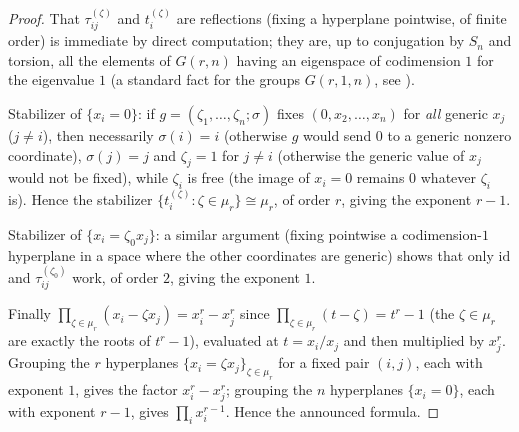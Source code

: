 \documentclass[10pt,a4paper]{amsart}
\begin{document}
\begin{proof}
That $\tau_{ij}^{(\zeta)}$ and $t_i^{(\zeta)}$ are reflections (fixing a hyperplane pointwise, of finite order) is immediate by direct computation; they are, up to conjugation by $S_n$ and torsion, all the elements of $G(r,n)$ having an eigenspace of codimension $1$ for the eigenvalue $1$ (a standard fact for the groups $G(r,1,n)$, see \cite[Ch.~2]{LT}).

Stabilizer of $\{x_i=0\}$: if $g=(\zeta_1,\dots,\zeta_n;\sigma)$ fixes $(0,x_2,\dots,x_n)$ for \emph{all} generic $x_j$ ($j\ne i$), then necessarily $\sigma(i)=i$ (otherwise $g$ would send $0$ to a generic nonzero coordinate), $\sigma(j)=j$ and $\zeta_j=1$ for $j\ne i$ (otherwise the generic value of $x_j$ would not be fixed), while $\zeta_i$ is free (the image of $x_i=0$ remains $0$ whatever $\zeta_i$ is). Hence the stabilizer $\{t_i^{(\zeta)}:\zeta\in\mu_r\}\cong\mu_r$, of order $r$, giving the exponent $r-1$.

Stabilizer of $\{x_i=\zeta_0x_j\}$: a similar argument (fixing pointwise a codimension-$1$ hyperplane in a space where the other coordinates are generic) shows that only $\mathrm{id}$ and $\tau_{ij}^{(\zeta_0)}$ work, of order $2$, giving the exponent $1$.

Finally $\prod_{\zeta\in\mu_r}(x_i-\zeta x_j)=x_i^r-x_j^r$ since $\prod_{\zeta\in\mu_r}(t-\zeta)=t^r-1$ (the $\zeta\in\mu_r$ are exactly the roots of $t^r-1$), evaluated at $t=x_i/x_j$ and then multiplied by $x_j^r$. Grouping the $r$ hyperplanes $\{x_i=\zeta x_j\}_{\zeta\in\mu_r}$ for a fixed pair $(i,j)$, each with exponent $1$, gives the factor $x_i^r-x_j^r$; grouping the $n$ hyperplanes $\{x_i=0\}$, each with exponent $r-1$, gives $\prod_i x_i^{r-1}$. Hence the announced formula.
\end{proof}
\end{document}
